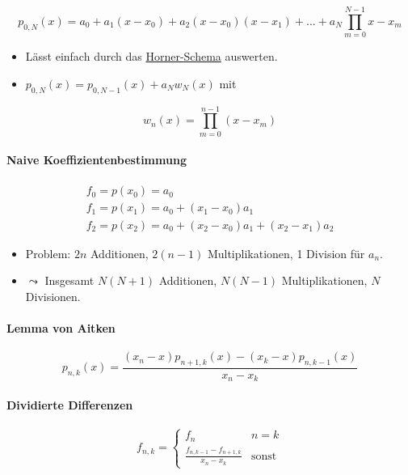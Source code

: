 \documentclass[a4paper, 14pt]{article}
\begin{document}
	\begin{equation}
		p_{0, N}(x) = a_0 + a_1 (x - x_0) + a_2 (x - x_0) (x - x_1) + ... + a_N \prod_{m = 0}^{N - 1}{x - x_m}
	\end{equation}

	\begin{itemize}
		\item Lässt einfach durch das \href{https://de.wikipedia.org/wiki/Horner-Schema}{Horner-Schema} auswerten.
		\item $p_{0, N}(x) = p_{0, N - 1}(x) + a_N w_N(x)$ mit
	\end{itemize}

	\begin{equation}
		w_n(x) = \prod_{m = 0}^{n - 1}{(x - x_m)}
	\end{equation}

	\paragraph{Naive Koeffizientenbestimmung}
	
	\begin{eqnarray}
		f_0 = p(x_0) = a_0 \\
		f_1 = p(x_1) = a_0 + (x_1 - x_0) a_1 \\
		f_2 = p(x_2) = a_0 + (x_2 - x_0) a_1 + (x_2 - x_1) a_2
	\end{eqnarray}
	
	\begin{itemize}
		\item Problem: $2n$ Additionen, $2(n - 1)$ Multiplikationen, 1 Division für $a_n$.
		\item $\leadsto$ Insgesamt $N(N + 1)$ Additionen, $N(N - 1)$ Multiplikationen, $N$ Divisionen.
	\end{itemize}

	\paragraph{Lemma von Aitken}

	\begin{equation}
		p_{n, k}(x) = \frac{(x_n - x) p_{n + 1, k}(x) - (x_k - x) p_{n, k - 1}(x)}{x_n - x_k}
	\end{equation}

	\paragraph{Dividierte Differenzen}

	\begin{equation}
		f_{n, k} = \begin{cases}
			f_{n} & n = k \\
			\frac{f_{n, k - 1} - f_{n + 1, k}}{x_n - x_k} & \textrm{sonst}
		\end{cases}
	\end{equation}
\end{document}
